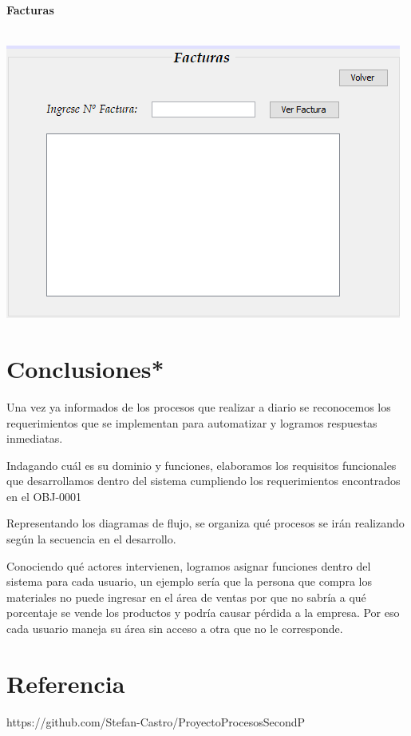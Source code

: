 \documentclass[12pt,a4paper]{article}
\begin{document}
 \par\vspace{2cm}
\textbf {Facturas}\\\\
\begin{center}
 \includegraphics[scale=0.7]{Facturas.png} 
 \end{center}

\section{Conclusiones*}\textbf{}
Una vez ya informados de los procesos que realizar a diario se reconocemos los requerimientos que se implementan para automatizar y logramos respuestas inmediatas.

Indagando cuál es su dominio y funciones, elaboramos los requisitos funcionales que desarrollamos dentro del sistema cumpliendo los requerimientos encontrados en el OBJ-0001

Representando los diagramas de flujo, se organiza qué procesos se irán realizando según la secuencia en el desarrollo. 

Conociendo qué actores intervienen, logramos asignar funciones dentro del sistema para cada usuario, un ejemplo sería que la persona que compra los materiales no puede ingresar en el área de ventas por que no sabría a qué porcentaje se vende los productos y podría causar pérdida a la empresa. Por eso cada usuario maneja su área sin acceso a otra que no le corresponde.  

 \par\vspace{6cm}\section{Referencia}\textbf{}
https://github.com/Stefan-Castro/ProyectoProcesosSecondP
\end{document}
